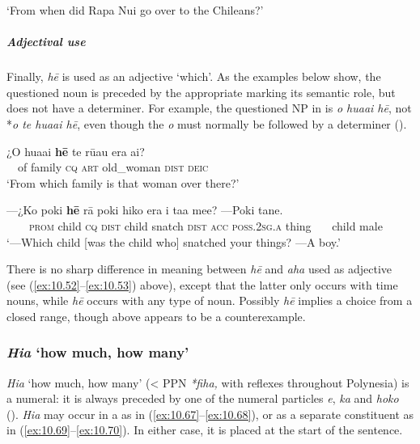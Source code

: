 \glt 
‘From when did Rapa Nui go over to the Chileans?’ \textstyleExampleref{[R616.673]} 
\z

\subparagraph{Adjectival use} Finally, \textit{hē} is used as an adjective ‘which’. As the examples below show, the questioned noun is preceded by the appropriate  marking its semantic role, but does not have a determiner. For example, the questioned NP in  is \textit{o hua{\ꞌ}ai hē}, not *\textit{o te hua{\ꞌ}ai hē}, even though the  \textit{o} must normally be followed by a determiner ().

\ea\label{ex:10.65}
\gll ¿O hua{\ꞌ}ai \textbf{hē} te rū{\ꞌ}au era {\ꞌ}ai? \\
~~of family \textsc{cq} \textsc{art} old\_woman \textsc{dist} \textsc{deic} \\

\glt 
‘From which family is that woman over there?’ \textstyleExampleref{[R413.305]} 
\z

\ea\label{ex:10.66}
\gll —¿Ko poki \textbf{hē} rā poki hiko era i ta{\ꞌ}a me{\ꞌ}e? —Poki tane. \\
~~~~\textsc{prom} child \textsc{cq} \textsc{dist} child snatch \textsc{dist} \textsc{acc} \textsc{poss.2sg.a} thing ~~~child male \\

\glt
‘—Which child [was the child who] snatched your things? —A boy.’ \textstyleExampleref{[R172.012–014]}
\z

There is no sharp difference in meaning between \textit{hē} and \textit{aha} used as adjective (see (\ref{ex:10.52}–\ref{ex:10.53}) above), except that the latter only occurs with time nouns, while \textit{hē} occurs with any type of noun. Possibly \textit{hē} implies a choice from a closed range, though  above appears to be a counterexample.

\subsubsection{\textit{Hia} ‘how much, how many’}\label{sec:10.3.2.4}
\textit{Hia} ‘how much, how many’ ({\textless} PPN \textit{*fiha,} with reflexes throughout Polynesia) is a numeral: it is always preceded by one of the numeral particles \textit{e}, \textit{ka} and \textit{hoko} (). \textit{Hia} may occur in a  as in (\ref{ex:10.67}–\ref{ex:10.68}), or as a separate constituent as in (\ref{ex:10.69}–\ref{ex:10.70}). In either case, it is placed at the start of the sentence.

